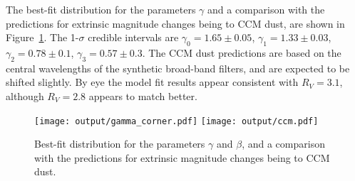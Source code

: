 \documentclass[11pt, oneside]{article}   	%
\begin{document}
The best-fit distribution for the parameters $\gamma$  and a comparison with the predictions for extrinsic
magnitude changes being to CCM dust, are shown in Figure~\ref{gamma:fig}.  The 1-$\sigma$ 
credible intervals are $\gamma_0=1.65 \pm 0.05$,
$\gamma_1 = 1.33  \pm 0.03$, $\gamma_2 = 0.78  \pm 0.1$, $\gamma_3 = 0.57  \pm 0.3$.
The CCM dust predictions are based 
on the central wavelengths of the synthetic broad-band filters, and are expected to be shifted slightly.
By eye the model fit results appear consistent with $R_V=3.1$, although $R_V=2.8$ appears to match better.
\begin{figure}[htbp] %
   \centering
   \texttt{[image: output/gamma\_corner.pdf]} 
   \texttt{[image: output/ccm.pdf]} 
   \caption{Best-fit distribution for the parameters $\gamma$ and $\beta$, and a comparison with the predictions for extrinsic
magnitude changes being to CCM dust.}
   \label{gamma:fig}
\end{figure}
\end{document}
